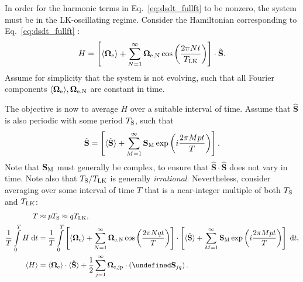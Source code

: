 \documentclass[
        fleqn,
        usenatbib,
    ]{mnras}
\newcommand*{\ev}[1]{\langle#1\rangle}
\newcommand*{\bm}[1]{\boldsymbol{\mathbf{#1}}}
\newcommand*{\uv}[1]{\hat{\bm{#1}}}
\newcommand*{\p}[1]{\left(#1\right)}
\newcommand*{\s}[1]{\left[#1\right]}
\let\Re\undefined
\DeclareMathOperator{\Re}{Re}
\begin{document}
In order for the harmonic terms in Eq.~\eqref{eq:dsdt_fullft} to be nonzero, the
system must be in the LK-oscillating regime. Consider the Hamiltonian
corresponding to Eq.~\eqref{eq:dsdt_fullft} \citep[see
e.g.][]{kinoshita,storch}:
\begin{equation}
    H = \s{\ev{\bm{\Omega}_{\rm e}} + \sum\limits_{N = 1}^\infty
            \bm{\Omega}_{\rm e, N}\cos \p{\frac{2\pi N t}{T_{\rm LK}}}}
            \cdot \uv{S}.
\end{equation}
Assume for simplicity that the system is not evolving, such that all Fourier
components $\ev{\bm{\Omega}_{\rm e}}, \bm{\Omega}_{\rm e, N}$ are constant in
time.

The objective is now to average $H$ over a suitable interval of time. Assume
that $\uv{S}$ is also periodic with some period $T_{\rm S}$, such that
\begin{equation}
    \uv{S} = \s{\ev{\uv{S}} + \sum\limits_{M = 1}^\infty
            \bm{S}_{\rm M}\exp \p{i\frac{2\pi M pt}{T}}}.
\end{equation}
Note that $\bm{S}_{\rm M}$ must generally be complex, to ensure that $\uv{S}
\cdot \uv{S}$ does not vary in time. Note also that $T_{\rm S} / T_{\rm LK}$ is
generally \emph{irrational}. Nevertheless, consider averaging over some interval
of time $T$ that is a near-integer multiple of both $T_{\rm S}$ and $T_{\rm
LK}$:
\begin{align}
    T &\approx pT_{\rm S} \approx qT_{\rm LK}\label{eq:T_def},\\
    \frac{1}{T}\int\limits_0^T H\;\mathrm{d}t
        &= \frac{1}{T}\int\limits_0^T
            \s{\ev{\bm{\Omega}_{\rm e}} + \sum\limits_{N = 1}^\infty
            \bm{\Omega}_{\rm e, N}\cos \p{\frac{2\pi N qt}{T}}}
            \cdot \s{\ev{\uv{S}} + \sum\limits_{M = 1}^\infty
            \bm{S}_{\rm M}\exp \p{i\frac{2\pi M pt}{T}}}\;\mathrm{d}t,\\
    \ev{H} &= \ev{\bm{\Omega}_{\rm e}} \cdot \ev{\bm{\uv{S}}}
            + \frac{1}{2}\sum\limits_{j = 1}^\infty
                \bm{\Omega}_{\rm e, jp} \cdot \left(\Re\bm{S}_{jq}\right).
                \label{eq:exp_h}
\end{align}
\end{document}
